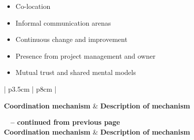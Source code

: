 \begin{itemize}
   \item Co-location
   \item Informal communication arenas
   \item Continuous change and improvement
   \item Presence from project management and owner
   \item Mutual trust and shared mental models
\end{itemize}

\begin{center}
    \begin{longtable}{| p{3.5cm} | p{8cm} |}

    \hline \textbf{Coordination mechanism} & \textbf{Description of mechanism} \\ \hline
    \endfirsthead

{{\bfseries \tablename\ \thetable{} -- continued from previous page}} \\ \hline
    \textbf{Coordination mechanism} & \textbf{Description of mechanism} \\ \hline
    \endhead

     \\ \hline
    \endfoot

   \endlastfoot


\end{longtable}
\end{center}
